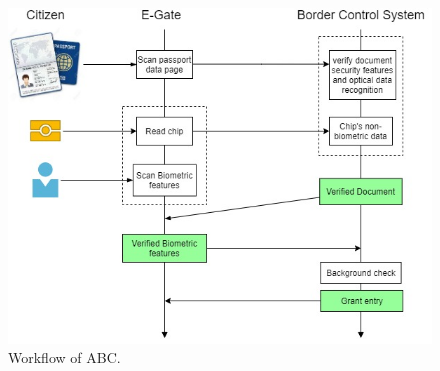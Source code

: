 \begin{figure}[H]
	\centering
	\includegraphics[scale=0.3]{Images/ABC.jpeg}
	\caption{Workflow of ABC.}
	\label{workflow}
\end{figure}

